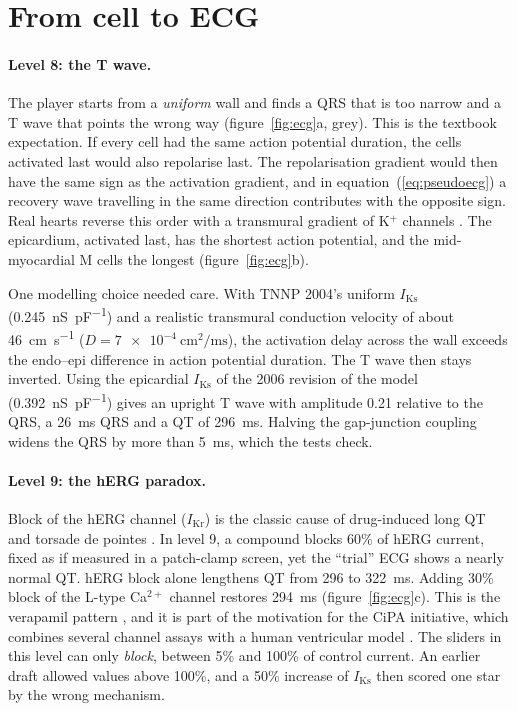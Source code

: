 \documentclass[11pt,a4paper]{article}
\newcommand{\IKr}{I_{\mathrm{Kr}}}
\newcommand{\IKs}{I_{\mathrm{Ks}}}
\begin{document}
\section{From cell to ECG}\label{sec:ecg}

\paragraph{Level 8: the T wave.} The player starts from a \emph{uniform} wall and finds a QRS that is too narrow and a T wave that points the wrong way (figure~\ref{fig:ecg}a, grey). This is the textbook expectation. If every cell had the same action potential duration, the cells activated last would also repolarise last. The repolarisation gradient would then have the same sign as the activation gradient, and in equation~(\ref{eq:pseudoecg}) a recovery wave travelling in the same direction contributes with the opposite sign. Real hearts reverse this order with a transmural gradient of K$^+$ channels \cite{YanAntzelevitch1998}. The epicardium, activated last, has the shortest action potential, and the mid-myocardial M cells the longest (figure~\ref{fig:ecg}b).

One modelling choice needed care. With TNNP 2004's uniform $\IKs$ (\SI{0.245}{\nano\siemens\per\pico\farad}) and a realistic transmural conduction velocity of about \SI{46}{\centi\metre\per\second} ($D = \SI{7e-4}{\centi\metre\squared\per\milli\second}$), the activation delay across the wall exceeds the endo--epi difference in action potential duration. The T wave then stays inverted. Using the epicardial $\IKs$ of the 2006 revision of the model (\SI{0.392}{\nano\siemens\per\pico\farad}) \cite{TP2006} gives an upright T wave with amplitude 0.21 relative to the QRS, a \SI{26}{\milli\second} QRS and a QT of \SI{296}{\milli\second}. Halving the gap-junction coupling widens the QRS by more than \SI{5}{\milli\second}, which the tests check.

\paragraph{Level 9: the hERG paradox.} Block of the hERG channel ($\IKr$) is the classic cause of drug-induced long QT and torsade de pointes \cite{SanguinettiTF2006,Redfern2003}. In level 9, a compound blocks 60\% of hERG current, fixed as if measured in a patch-clamp screen, yet the ``trial'' ECG shows a nearly normal QT. hERG block alone lengthens QT from 296 to \SI{322}{\milli\second}. Adding 30\% block of the L-type Ca$^{2+}$ channel restores \SI{294}{\milli\second} (figure~\ref{fig:ecg}c). This is the verapamil pattern \cite{Zhang1999}, and it is part of the motivation for the CiPA initiative, which combines several channel assays with a human ventricular model \cite{Colatsky2016,OHara2011}. The sliders in this level can only \emph{block}, between 5\% and 100\% of control current. An earlier draft allowed values above 100\%, and a 50\% increase of $\IKs$ then scored one star by the wrong mechanism.
\end{document}
